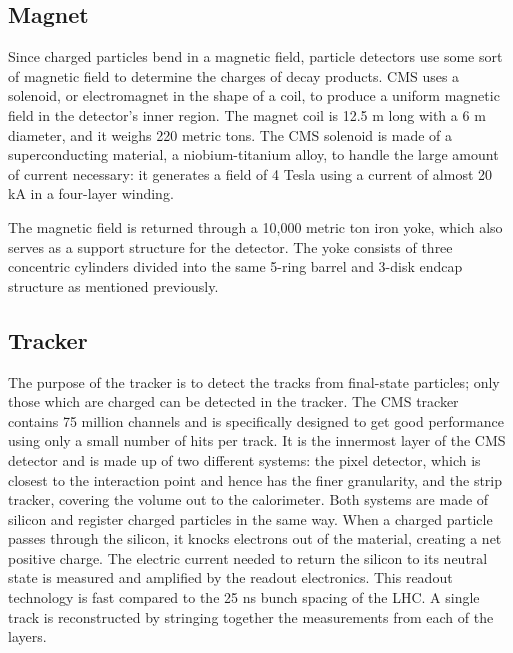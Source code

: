 \subsection{Magnet}
\label{exp:magnet}

Since charged particles bend in a magnetic field, 
particle detectors use some sort of magnetic field to determine 
the charges of decay products.  
CMS uses a solenoid, or electromagnet in the shape of a coil, 
to produce a uniform magnetic field in the detector's inner region.  
The magnet coil is 12.5 m long with a 6 m diameter, 
and it weighs 220 metric tons.  
The CMS solenoid is made of a superconducting material, 
a niobium-titanium alloy, 
to handle the large amount of current necessary: 
it generates a field of 4 Tesla using 
a current of almost 20 kA in a four-layer winding.

The magnetic field is returned through a 10,000 metric ton iron yoke, 
which also serves as a support structure for the detector.  
The yoke consists of three concentric cylinders divided into the same 
5-ring barrel and 3-disk endcap structure as mentioned previously.  

\subsection{Tracker}
\label{exp:tracker}
The purpose of the tracker is to detect the 
tracks from 
final-state particles;
only those which are charged can be detected in the tracker.  
The CMS tracker contains 75 million channels
and is specifically designed to get good performance 
using only a small number of hits per track.
It is the innermost layer of the CMS detector
and is made up of two different systems: 
the pixel detector, 
which is closest to the interaction point and hence has the finer granularity, 
and the strip tracker, 
covering the volume out to the calorimeter. 
Both systems are made of silicon and register charged particles in the same way. 
When a charged particle passes through the silicon,
it knocks electrons out of the material, 
creating a net positive charge.  
The electric current needed to return the silicon
to its neutral state is measured and amplified
by the readout electronics.  
This readout technology is fast compared to the 
25 ns bunch spacing of the LHC.  
A single track is reconstructed by stringing together
the measurements from each of the layers.  

